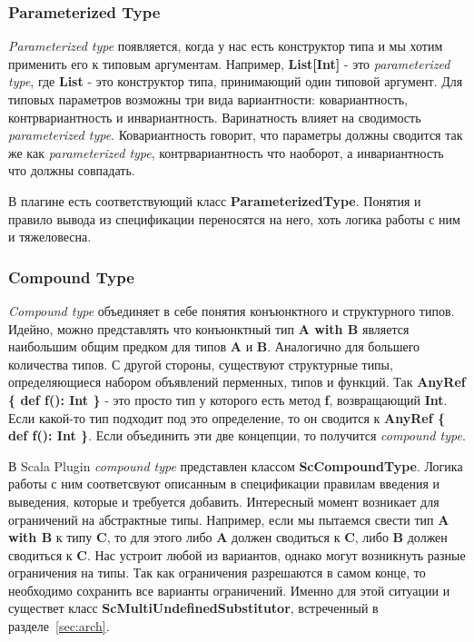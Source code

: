 \subsubsection{Parameterized Type}
\textit{Parameterized type} появляется, когда у нас есть конструктор типа и мы хотим
применить его к типовым аргументам.
Например, \textbf{List[Int]} - это \textit{parameterized type},
где \textbf{List} - это конструктор типа, принимающий один типовой
аргумент.
Для типовых параметров возможны три вида вариантности:
ковариантность, контрвариантность и инвариантность.
Варинатность влияет на сводимость \textit{parameterized type}.
Ковариантность говорит, что параметры должны сводится так же как
\textit{parameterized type}, контрвариантность что наоборот, а инвариантность
что должны совпадать.

В плагине есть соответствующий класс \textbf{ParameterizedType}.
Понятия и правило вывода из спецификации переносятся на него, хоть логика
работы с ним и тяжеловесна.

\subsubsection{Compound Type}
\textit{Compound type} объединяет в себе понятия конъюнктного и структурного
типов.
Идейно, можно представлять что конъюнктный тип \textbf{A with B} является
наибольшим общим предком для типов \textbf{A} и \textbf{B}.
Аналогично для большего количества типов.
С другой стороны, существуют структурные типы, определяющиеся набором объявлений
перменных, типов и функций.
Так \textbf{AnyRef \{ def f(): Int \}} - это просто тип у которого есть
метод \textbf{f}, возвращающий \textbf{Int}.
Если какой-то тип подходит под это определение, то он сводится к
\textbf{AnyRef \{ def f(): Int \}}.
Если объединить эти две концепции, то получится \textit{compound type}.

В Scala Plugin \textit{compound type} представлен классом \textbf{ScCompoundType}.
Логика работы с ним соответсвуют описанным в спецификации правилам введения и
выведения, которые и требуется добавить.
Интересный момент возникает для ограничений на абстрактные типы.
Например, если мы пытаемся свести тип \textbf{A with B} к типу \textbf{C},
то для этого либо \textbf{A} должен сводиться к \textbf{C}, либо \textbf{B}
должен сводиться к \textbf{C}.
Нас устроит любой из вариантов, однако могут возникнуть разные ограничения на
типы.
Так как ограничения разрешаются в самом конце, то необходимо сохранить все
варианты ограничений.
Именно для этой ситуации и существет класс \textbf{ScMultiUndefinedSubstitutor},
встреченный в разделе~\ref{sec:arch}.


